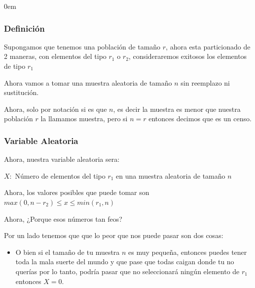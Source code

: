\documentclass[12pt, fleqn]{report}                             %
\newenvironment{SmallIndentation}[1][0.75em]                    %
        {\begin{adjustwidth}{#1}{}\begin{footnotesize}}             %
        {\end{footnotesize}\end{adjustwidth}}                       %
\theoremstyle{break}                                            %
\begin{document}
                \begin{multicols}{2}
                \begin{SmallIndentation}[0em]


                    \subsubsection{Definición}

                        Supongamos que tenemos una población de tamaño $r$, ahora
                        esta particionado de 2 maneras, con elementos del tipo $r_1$
                        o $r_2$, consideraremos exitosos los elementos de tipo $r_1$

                        Ahora vamos a tomar una muestra aleatoria de tamaño $n$ sin reemplazo
                        ni sustitución.

                        Ahora, solo por notación si es que $n$, es decir la muestra es menor
                        que nuestra población $r$ la llamamos muestra, pero si $n = r$ entonces
                        decimos que es un censo.

                        \subsubsection{Variable Aleatoria}

                            Ahora, nuestra variable aleatoria sera:

                            $X : $ Número de elementos del tipo $r_1$ en una muestra aleatoria de tamaño $n$

                            Ahora, los valores posibles que puede tomar son $max(0, n - r_2) \leq x \leq min(r_1, n)$

                            Ahora, ¿Porque esos números tan feos?

                            Por un lado tenemos que que lo peor que nos puede pasar son dos cosas:
                            \begin{itemize}
                                \item 
                                    O bien si el tamaño de tu muestra $n$ es muy pequeña, entonces puedes
                                    tener toda la mala suerte del mundo y que pase que todas caigan donde
                                    tu no querías por lo tanto, podría pasar que no seleccionará
                                    ningún elemento de $r_1$ entonces $X = 0$.


\end{itemize}
\end{SmallIndentation}
\end{multicols}
\end{document}
